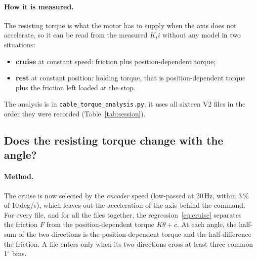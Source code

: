\documentclass[10pt,a4paper]{article}
\numberwithin{equation}{section}
\begin{document}
\paragraph{How it is measured.} The resisting torque is what the motor has to supply when the axis does not accelerate, so it can be read from the measured $K_t i$ without any model in two situations:
\begin{itemize}
\item \textbf{cruise} at constant speed: friction plus position-dependent torque;
\item \textbf{rest} at constant position: holding torque, that is position-dependent torque plus the friction left loaded at the stop.
\end{itemize}
The analysis is in \texttt{cable\_torque\_analysis.py}; it uses all sixteen V2 files in the order they were recorded (Table~\ref{tab:session}).

\subsection{Does the resisting torque change with the angle?}\label{sec:angle}
\paragraph{Method.} The cruise is now selected by the \emph{encoder} speed (low-passed at 20\,Hz, within 3\,\% of 10\,deg/s), which leaves out the acceleration of the axis behind the command. For every file, and for all the files together, the regression~\eqref{eq:cruise} separates the friction $F$ from the position-dependent torque $K\theta+c$. At each angle, the half-sum of the two directions is the position-dependent torque and the half-difference the friction. A file enters only when its two directions cross at least three common 1$^\circ$ bins.
\end{document}
